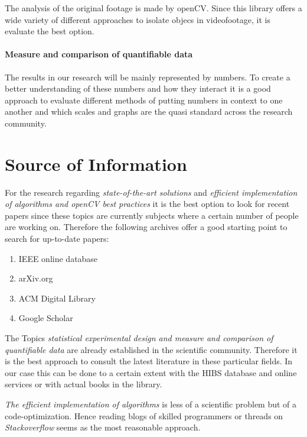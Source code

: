\documentclass[titlepage, a4paper, 11pt]{scrartcl}
\begin{document}
The analysis of the original footage is made by openCV. Since this library offers a wide variety of different approaches to isolate objecs in videofootage,
it is evaluate the best option.

\paragraph{Measure and comparison of quantifiable data}

The results in our research will be mainly represented by numbers. To create a better understanding of these numbers and how they interact it is a good approach to 
evaluate different methods of putting numbers in context to one another and which scales and graphs are the quasi standard across the research community.


\section{Source of Information}

For the research regarding \textit{state-of-the-art solutions} and \textit{efficient implementation of algorithms and openCV best practices} it is the best option to look for recent papers since these topics are currently
subjects where a certain number of people are working on. Therefore the following archives offer a good starting point to search for up-to-date papers:

\begin{enumerate}
    \item IEEE online database
    \item arXiv.org
    \item ACM Digital Library
    \item Google Scholar
\end{enumerate}

The Topics \textit{statistical experimental design and measure and comparison of quantifiable data} are already established in the scientific community.
Therefore it is the best approach to consult the latest literature in these particular fields. In our case this can be done to a certain extent with the HIBS database
and online services or with actual books in the library.

\textit{The efficient implementation of algorithms} is less of a scientific problem but of a code-optimization. Hence reading blogs of skilled programmers or threads on
\textit{Stackoverflow} seems as the most reasonable approach.
\end{document}
